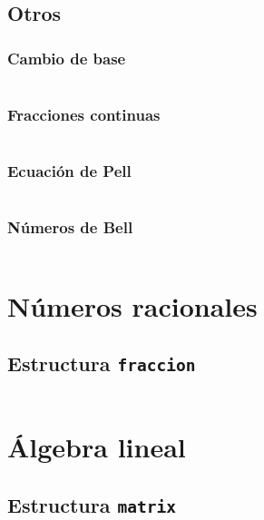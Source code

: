 \documentclass[11pt]{article}
\begin{document}
		\subsection{Otros}
			\subsubsection{Cambio de base}
			\inputminted[tabsize=2,breaklines,firstline=442,lastline=462,fontsize=\small]{c++}{numberTheory.cpp}
			
			\subsubsection{Fracciones continuas}
			\inputminted[tabsize=2,breaklines,firstline=598,lastline=640,fontsize=\small]{c++}{numberTheory.cpp}
			
			\subsubsection{Ecuación de Pell}
			\inputminted[tabsize=2,breaklines,firstline=642,lastline=655,fontsize=\small]{c++}{numberTheory.cpp}
			
			\subsubsection{Números de Bell}
			\inputminted[tabsize=2,breaklines,firstline=894,lastline=906,fontsize=\small]{c++}{numberTheory.cpp}
			
	\newpage
	\section{Números racionales}
		\subsection{Estructura \texttt{fraccion}}
		\inputminted[tabsize=2,breaklines,firstline=7,lastline=123,fontsize=\small]{c++}{fraccion.cpp}
		
	\newpage
	\section{Álgebra lineal}
		\subsection{Estructura \texttt{matrix}}
		\inputminted[tabsize=2,breaklines,firstline=9,lastline=33,fontsize=\small]{c++}{matrix.cpp}
		\inputminted[tabsize=2,breaklines,firstline=122,lastline=227,fontsize=\small]{c++}{matrix.cpp}
		
\end{document}
